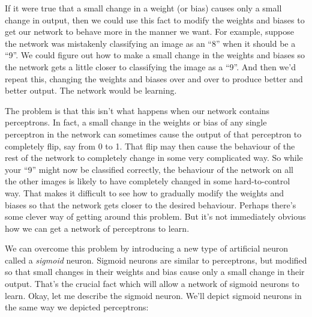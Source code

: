 If it were true that a small change in a weight (or bias) causes only a small change in output, then we could use this fact to modify the weights and biases to get our network to behave more in the manner we want. For example, suppose the network was mistakenly classifying an image as an ``8'' when it should be a ``9''. We could figure out how to make a small change in the weights and biases so the network gets a little closer to classifying the image as a ``9''. And then we'd repeat this, changing the weights and biases over and over to produce better and better output. The network would be learning.

The problem is that this isn't what happens when our network contains perceptrons. In fact, a small change in the weights or bias of any single perceptron in the network can sometimes cause the output of that perceptron to completely flip, say from 0 to 1. That flip may then cause the behaviour of the rest of the network to completely change in some very complicated way. So while your ``9'' might now be classified correctly, the behaviour of the network on all the other images is likely to have completely changed in some hard-to-control way. That makes it difficult to see how to gradually modify the weights and biases so that the network gets closer to the desired behaviour. Perhaps there's some clever way of getting around this problem. But it's not immediately obvious how we can get a network of perceptrons to learn.

We can overcome this problem by introducing a new type of artificial neuron called a \textit{sigmoid} neuron. Sigmoid neurons are similar to perceptrons, but modified so that small changes in their weights and bias cause only a small change in their output. That's the crucial fact which will allow a network of sigmoid neurons to learn.
Okay, let me describe the sigmoid neuron. We'll depict sigmoid neurons in the same way we depicted perceptrons: 

\begin{marginfigure}
\begin{neuralnetwork}[height=4]
	\newcommand{\nodetextclear}[2]{}
	\newcommand{\nodetextx}[2]{$x_#2$}
	\setdefaultnodetext{\nodetextclear}
	\inputtext[count=3, bias=false, title=Input, text=\nodetextx]
	\outputlayer[count=1, bias=false, title=Output,] \linklayers
\end{neuralnetwork}
\end{marginfigure}


